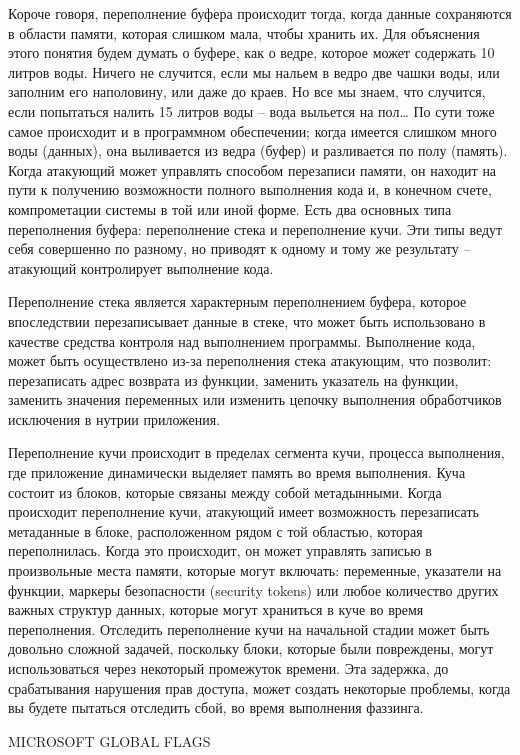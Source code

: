 \documentclass[12pt]{book}
\begin{document}
Короче говоря, переполнение буфера происходит тогда, когда данные сохраняются в области памяти, которая слишком мала, чтобы хранить их. Для объяснения этого понятия будем думать о буфере, как о ведре, которое может содержать 10 литров воды. Ничего не случится, если мы нальем в ведро две чашки воды, или заполним его наполовину, или даже до краев. Но все мы знаем, что случится, если попытаться налить 15 литров воды – вода выльется на пол… По сути тоже самое происходит и в программном обеспечении; когда имеется слишком много воды (данных), она выливается из ведра (буфер) и разливается по полу (память). Когда атакующий может управлять способом перезаписи памяти, он находит на пути к получению возможности полного выполнения кода и, в конечном счете, компрометации системы в той или иной форме. Есть два основных типа переполнения буфера: переполнение стека и переполнение кучи. Эти типы ведут себя совершенно по разному, но приводят к одному и тому же результату – атакующий контролирует выполнение кода.

Переполнение стека является характерным переполнением буфера, которое впоследствии перезаписывает данные в стеке, что может быть использовано в качестве средства контроля над выполнением программы. Выполнение кода, может быть осуществлено из-за переполнения стека атакующим, что позволит: перезаписать адрес возврата из функции, заменить указатель на функции, заменить значения переменных или изменить цепочку выполнения обработчиков исключения в нутрии приложения. 

Переполнение кучи происходит в пределах сегмента кучи, процесса выполнения, где приложение динамически выделяет память во время выполнения. Куча состоит из блоков, которые связаны между собой метадынными. Когда происходит переполнение кучи, атакующий имеет возможность перезаписать метаданные в блоке, расположенном рядом с той областью, которая переполнилась. Когда это происходит, он может управлять записью в произвольные места памяти, которые могут включать: переменные, указатели на функции, маркеры безопасности (security tokens) или любое количество других важных структур данных, которые могут храниться в куче во время переполнения. Отследить переполнение кучи на начальной стадии может быть довольно сложной задачей, поскольку блоки, которые были повреждены, могут использоваться через некоторый промежуток времени. Эта задержка, до срабатывания нарушения прав доступа, может создать некоторые проблемы, когда вы будете пытаться отследить сбой, во время выполнения фаззинга.

MICROSOFT GLOBAL FLAGS
\end{document}
